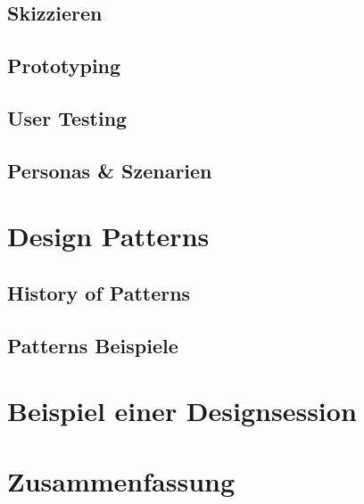\subsection{Skizzieren}
\subsection{Prototyping}
\subsection{User Testing}
\subsection{Personas \& Szenarien}

\section{Design Patterns}
\subsection{History of Patterns}
\subsection{Patterns Beispiele}

\section{Beispiel einer Designsession}

\section*{Zusammenfassung}